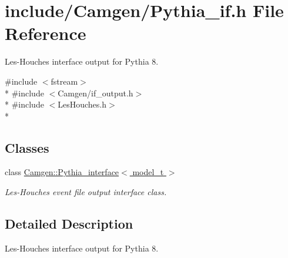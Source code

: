 \hypertarget{a00749}{}\section{include/\+Camgen/\+Pythia\+\_\+if.h File Reference}
\label{a00749}


Les-\/\+Houches interface output for Pythia 8.  


{\ttfamily \#include $<$fstream$>$}\\*
{\ttfamily \#include $<$Camgen/if\+\_\+output.\+h$>$}\\*
{\ttfamily \#include $<$Les\+Houches.\+h$>$}\\*
\subsection*{Classes}
\begin{DoxyCompactItemize}
\item 
class \hyperlink{a00459}{Camgen\+::\+Pythia\+\_\+interface$<$ model\+\_\+t $>$}
\begin{DoxyCompactList}\small\item\em Les-\/\+Houches event file output interface class. \end{DoxyCompactList}\end{DoxyCompactItemize}


\subsection{Detailed Description}
Les-\/\+Houches interface output for Pythia 8. 

